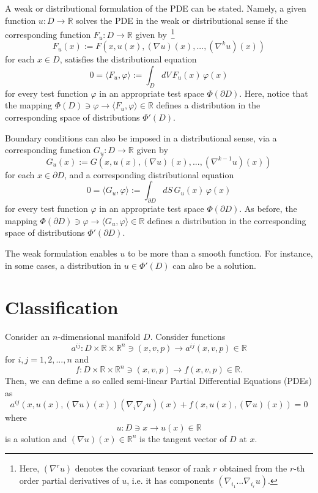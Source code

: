 \documentclass[aps,prl,twocolumn,groupedaddress]{revtex4-2}
\newcommand{\RR}{\mathbb{R}}
\begin{document}
A weak or distributional formulation of the PDE can be stated.
Namely, a given function $u:D\to \RR$ solves the PDE in the weak or distributional sense if the corresponding function $F_u:D\to \RR$ given by~\footnote{Here, $(\nabla^r u)$ denotes the covariant tensor of rank $r$ obtained from the $r$-th 
order partial derivatives of $u$, i.e. it has components $(\nabla_{i_1} ... \nabla_{i_r} u)$.}
$$
F_u(x):=F(x,u(x),(\nabla u)(x),...,(\nabla^k u)(x))
$$
for each $x\in D$, satisfies the distributional equation
$$
0
=
\langle F_u,\varphi \rangle 
:= 
\int_D dV\, F_u(x)\, \varphi(x)
$$
for every test function $\varphi$ in an appropriate test space $\Phi(\partial D)$.
Here, notice that the mapping $\Phi(D)\ni \varphi\to \langle F_u, \varphi\rangle\in \RR$ defines a distribution in the corresponding space of distributions $\Phi'(D)$.

Boundary conditions can also be imposed in a distributional sense, via a corresponding function
$G_u:D\to \RR$ given by
$$
G_u(x):=G(x,u(x),(\nabla u)(x),...,(\nabla^{k-1} u)(x))
$$
for each $x\in \partial D$,
and a corresponding distributional equation
$$
0
=
\langle G_u,\varphi \rangle 
:= 
\int_{\partial D} dS\, G_u(x)\, \varphi(x)
$$
for every test function $\varphi$ in an appropriate test space $\Phi(\partial D)$.
As before, the mapping $\Phi(\partial D)\ni \varphi\to \langle G_u, \varphi\rangle\in \RR$ defines a distribution in the corresponding space of distributions $\Phi'(\partial D)$.

The weak formulation enables $u$ to be more than a smooth function.
For instance, in some cases, a distribution in $u\in \Phi'(D)$ can also be a solution.

\section{Classification}

Consider an $n$-dimensional manifold $D$.
Consider functions
$$
a^{ij}:D\times \RR\times \RR^n \ni (x,v,p) \to a^{ij}(x,v,p) \in \RR
$$
for $i,j=1,2,...,n$ and
$$
f:D\times \RR\times \RR^n \ni (x,v,p) \to f(x,v,p) \in \RR.
$$
Then, we can defime a so called semi-linear Partial Differential Equations (PDEs) as
\begin{equation}
\label{eq:X1}
a^{ij}(x,u(x),(\nabla u)(x))
(
\nabla_i
\nabla_j
u)
(x)
+
f(x,u(x),(\nabla u)(x))
=
0
\end{equation}
where 
$$
u:D\ni x \to u(x)\in \RR
$$ 
is a solution and $(\nabla u)(x)\in \RR^n$ is the tangent vector of $D$ at $x$.
\end{document}
